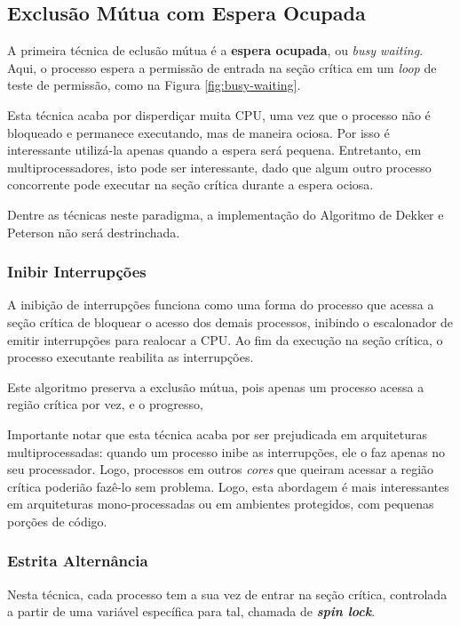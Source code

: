 \subsection{Exclusão Mútua com Espera Ocupada}
A primeira técnica de eclusão mútua é a \textbf{espera ocupada}, ou \textit{busy waiting}. Aqui, o processo espera a permissão de entrada na seção crítica em um \textit{loop} de teste de permissão, como na Figura \ref{fig:busy-waiting}.

Esta técnica acaba por disperdiçar muita CPU, uma vez que o processo não é bloqueado e permanece executando, mas de maneira ociosa. Por isso é interessante utilizá-la apenas quando a espera será pequena. Entretanto, em multiprocessadores, isto pode ser interessante, dado que algum outro processo concorrente pode executar na seção crítica durante a espera ociosa.

Dentre as técnicas neste paradigma, a implementação do Algoritmo de Dekker e Peterson não será destrinchada.

\subsubsection{Inibir Interrupções}
A inibição de interrupções funciona como uma forma do processo que acessa a seção crítica de bloquear o acesso dos demais processos, inibindo o escalonador de emitir interrupções para realocar a CPU. Ao fim da execução na seção crítica, o processo executante reabilita as interrupções.

Este algoritmo preserva a exclusão mútua, pois apenas um processo acessa a região crítica por vez, e o progresso, %

Importante notar que esta técnica acaba por ser prejudicada em arquiteturas multiprocessadas: quando um processo inibe as interrupções, ele o faz apenas no seu processador. Logo, processos em outros \textit{cores} que queiram acessar a região crítica poderião fazê-lo sem problema. Logo, esta abordagem é mais interessantes em arquiteturas mono-processadas ou em ambientes protegidos, com pequenas porções de código.




\subsubsection{Estrita Alternância}
Nesta técnica, cada processo tem a sua vez de entrar na seção crítica, controlada a partir de uma variável específica para tal, chamada de \textbf{\textit{spin lock}}.


